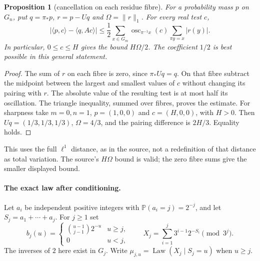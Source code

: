 \documentclass[11pt]{article}
\newtheorem{proposition}{Proposition}
\theoremstyle{remark}\newtheorem{remark}[proposition]{Remark}
\begin{document}
\begin{proposition}[cancellation on each residue fibre]
\label{prop:mazur-centred-test}
For a probability mass $p$ on $G_n$, put $q=\pi_*p$, $r=p-Uq$ and
$\Omega=\|r\|_1$. For every real test $c$,
\begin{equation}
 |\langle p,c\rangle-\langle q,Ac\rangle|
 \le \frac12\sum_{x\in G_m}
       \operatorname{osc}_{\pi^{-1}x}(c)
       \sum_{\pi y=x}|r(y)|.
 \label{eq:mazur-centred-test}
\end{equation}
In particular, $0\le c\le H$ gives the bound $H\Omega/2$.
The coefficient $1/2$ is best possible in this general statement.
\end{proposition}
\begin{proof}
The sum of $r$ on each fibre is zero, since $\pi_*Uq=q$.
On that fibre subtract the midpoint between the largest and smallest
values of $c$ without changing its pairing with $r$.
The absolute value of the resulting test is at most half its oscillation.
The triangle inequality, summed over fibres, proves the estimate.
For sharpness take $m=0,n=1$, $p=(1,0,0)$ and $c=(H,0,0)$,
with $H>0$. Then $Uq=(1/3,1/3,1/3)$, $\Omega=4/3$, and the
pairing difference is $2H/3$. Equality holds.
\end{proof}

This uses the full $\ell^1$ distance, as in the source, not a redefinition
of that distance as total variation. The source's $H\Omega$ bound is
valid; the zero fibre sums give the smaller displayed bound.

\paragraph{The exact law after conditioning.}
Let $a_i$ be independent positive integers with
$\mathbb P(a_i=j)=2^{-j}$, and let $S_j=a_1+\cdots+a_j$.
For $j\ge1$ set
\[
 b_j(u)=
 \begin{cases}\binom{u-1}{j-1}2^{-u}&u\ge j,\\0&u<j,\end{cases}
 \qquad
 X_j=\sum_{i=1}^j3^{i-1}2^{-S_i}\pmod{3^j}.
\]
The inverses of $2$ here exist in $G_j$.
Write $\mu_{j,u}=\operatorname{Law}(X_j\mid S_j=u)$ when $u\ge j$.
\end{document}
